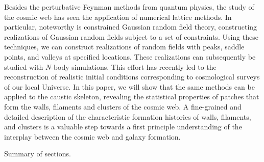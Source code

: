 \documentclass[a4paper, 11pt]{article}
\begin{document}
Besides the perturbative Feynman methods from quantum physics, the study of the cosmic web has seen the application of numerical lattice methods. In particular, noteworthy is constrained Gaussian random field theory, constructing realizations of Gaussian random fields subject to a set of constraints. Using these techniques, we can construct realizations of random fields with peaks, saddle points, and valleys at specified locations. These realizations can subsequently be studied with $N$-body simulations. This effort has recently led to the reconstruction of realistic initial conditions corresponding to cosmological surveys of our local Universe. In this paper, we will show that the same methods can be applied to the caustic skeleton, revealing the statistical properties of patches that form the walls, filaments and clusters of the cosmic web. A fine-grained and detailed description of the characteristic formation histories of walls, filaments, and clusters is a valuable step towards a first principle understanding of the interplay between the cosmic web and galaxy formation.

\begin{framed}
{\color{red}Summary of sections.}
\end{framed}

\end{document}
